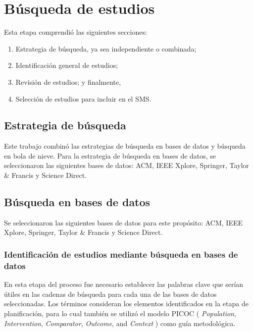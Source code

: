 \section{Búsqueda de estudios}

Esta etapa comprendió las siguientes secciones: 
\begin{enumerate}
  \item Estrategia de búsqueda, ya sea independiente o combinada;
  \item Identificación general de estudios;
  \item Revisión de estudios; y finalmente,
  \item Selección de estudios para incluir en el SMS.\@
\end{enumerate}

\subsection{Estrategia de búsqueda}

Este trabajo combinó las estrategias de búsqueda en bases de datos y búsqueda en bola de nieve. 
Para la estrategia de búsqueda en bases de datos, se seleccionaron las siguientes bases de datos: ACM, IEEE Xplore, Springer, Taylor \& Francis y Science Direct.

\subsection{Búsqueda en bases de datos}\label{subsec:busquedaBasesDatos}
Se seleccionaron las siguientes bases de datos para este propósito: ACM, IEEE Xplore, Springer, Taylor \& Francis y Science Direct.

\subsubsection{Identificación de estudios mediante búsqueda en bases de datos}\label{subsubsec:identificacionEstudios}
En esta etapa del proceso fue necesario establecer las palabras clave que serían útiles en las cadenas de búsqueda para cada una de las bases de datos seleccionadas. 
Los términos consideran los elementos identificados en la etapa de planificación, para lo cual también se utilizó el modelo PICOC ( \textit{Population}, \textit{Intervention}, \textit{Comparator}, \textit{Outcome}, and \textit{Context} ) como guía metodológica.

